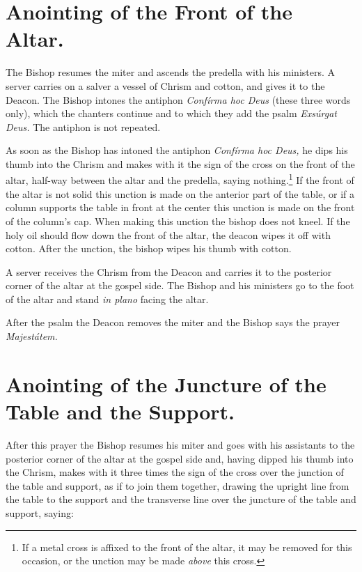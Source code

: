 \documentclass[letterpaper]{report}
\begin{document}
{    \section{Anointing of the Front of the Altar.}

    \rubric The Bishop resumes the miter and ascends the predella with his
    ministers. A server carries on a salver a vessel of Chrism and cotton, and
    gives it to the Deacon. The Bishop intones the antiphon \textit{Confírma
    hoc Deus} (these three words only), which the chanters continue and to
    which they add the psalm \textit{Exsúrgat Deus.} The antiphon is not
    repeated.

    \rubric As soon as the Bishop has intoned the antiphon \textit{Confírma hoc
    Deus,} he dips his thumb into the Chrism and makes with it the sign of the
    cross on the front of the altar, half-way between the altar and the
    predella, saying nothing.\footnote{If a metal cross is affixed to the front
    of the altar, it may be removed for this occasion, or the unction may be
    made \textit{above} this cross.} If the front of the altar is not solid
    this unction is made on the anterior part of the table, or if a column
    supports the table in front at the center this unction is made on the front
    of the column's cap. When making this unction the bishop does not kneel. If
    the holy oil should flow down the front of the altar, the deacon wipes it
    off with cotton. After the unction, the bishop wipes his thumb with cotton.

    \rubric A server receives the Chrism from the Deacon and carries it to the
    posterior corner of the altar at the gospel side. The Bishop and his
    ministers go to the foot of the altar and stand \textit{in plano} facing
    the altar.

    After the psalm the Deacon removes the miter and the Bishop says the prayer
    \textit{Majestátem.}

    \section{Anointing of the Juncture of the Table and the Support.}

    \rubric After this prayer the Bishop resumes his miter and goes with his
    assistants to the posterior corner of the altar at the gospel side and,
    having dipped his thumb into the Chrism, makes with it three times the sign
    of the cross over the junction of the table and support, as if to join them
    together, drawing the upright line from the table to the support and the
    transverse line over the juncture of the table and support, saying:

}
\end{document}
